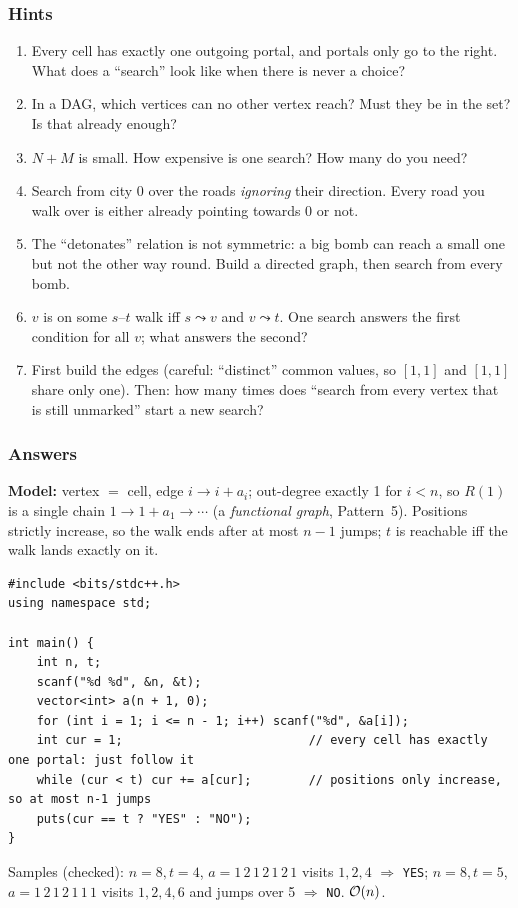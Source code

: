 \subsubsection*{Hints}
\begin{enumerate}[leftmargin=*, label=\textbf{E2.\arabic*}]
    \item Every cell has exactly one outgoing portal, and portals only go to the right. What does a ``search'' look like when there is never a choice?
    \item In a DAG, which vertices can no other vertex reach? Must they be in the set? Is that already enough?
    \item $N + M$ is small. How expensive is one search? How many do you need?
    \item Search from city 0 over the roads \emph{ignoring} their direction. Every road you walk over is either already pointing towards 0 or not.
    \item The ``detonates'' relation is not symmetric: a big bomb can reach a small one but not the other way round. Build a directed graph, then search from every bomb.
    \item $v$ is on some $s$--$t$ walk iff $s \leadsto v$ and $v \leadsto t$. One search answers the first condition for all $v$; what answers the second?
    \item First build the edges (careful: ``distinct'' common values, so $[1,1]$ and $[1,1]$ share only one). Then: how many times does ``search from every vertex that is still unmarked'' start a new search?
\end{enumerate}

\subsubsection*{Answers}

\begin{solutionbox}
\textbf{Model:} vertex $=$ cell, edge $i \to i + a_i$; out-degree exactly 1 for $i < n$, so $R(1)$ is a single chain $1 \to 1 + a_1 \to \cdots$ (a \emph{functional graph}, Pattern~5). Positions strictly increase, so the walk ends after at most $n - 1$ jumps; $t$ is reachable iff the walk lands exactly on it.
\begin{lstlisting}[style=cpp]
#include <bits/stdc++.h>
using namespace std;

int main() {
    int n, t;
    scanf("%d %d", &n, &t);
    vector<int> a(n + 1, 0);
    for (int i = 1; i <= n - 1; i++) scanf("%d", &a[i]);
    int cur = 1;                          // every cell has exactly one portal: just follow it
    while (cur < t) cur += a[cur];        // positions only increase, so at most n-1 jumps
    puts(cur == t ? "YES" : "NO");
}
\end{lstlisting}
Samples (checked): $n=8, t=4$, $a = 1\,2\,1\,2\,1\,2\,1$ visits $1, 2, 4$ $\Rightarrow$ \texttt{YES}; $n=8, t=5$, $a = 1\,2\,1\,2\,1\,1\,1$ visits $1, 2, 4, 6$ and jumps over 5 $\Rightarrow$ \texttt{NO}. $\mathcal{O}(n)$.
\end{solutionbox}

